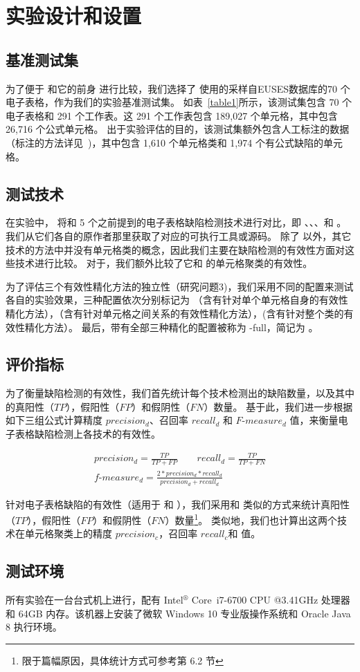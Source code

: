 \section{实验设计和设置}


\subsection{基准测试集} 
为了便于 \wa 和它的前身 \cu 进行比较，我们选择了 \cu 使用的采样自EUSES数据库的70 个电子表格，作为我们的实验基准测试集。
如表~\ref{table1}所示，该测试集包含 70 个电子表格和 291 个工作表。这 291 个工作表包含 189,027 个单元格，其中包含 26,716 个公式单元格。
出于实验评估的目的，该测试集额外包含人工标注的数据（标注的方法详见~\cite{cheung2016custodes})，其中包含 1,610 个单元格类和 1,974 个有公式缺陷的单元格。

\subsection{测试技术} 
在实验中， \wa 将和 5 个之前提到的电子表格缺陷检测技术进行对比，即 \uc、\di、\am、\ca 和 \cu 。
我们从它们各自的原作者那里获取了对应的可执行工具或源码。
除了 \ca 以外，其它技术的方法中并没有单元格类的概念，因此我们主要在缺陷检测的有效性方面对这些技术进行比较。
对于\ca，我们额外比较了它和 \wa 的单元格聚类的有效性。

为了评估三个有效性精化方法的独立性（研究问题3)，我们采用不同的配置来测试各自的实验效果，三种配置依次分别标记为 \wasc （含有针对单个单元格自身的有效性精化方法），\wamc （含有针对单元格之间关系的有效性精化方法），\wawc (含有针对整个类的有效性精化方法）。
最后，带有全部三种精化的配置被称为 \wa-full，简记为 \wa 。

\subsection{评价指标} 
为了衡量缺陷检测的有效性，我们首先统计每个技术检测出的缺陷数量，以及其中的真阳性（$TP$），假阳性（$FP$）和假阴性（$FN$）数量。
基于此，我们进一步根据如下三组公式计算精度 $precision_d$、召回率 $recall_d$ 和 $F\text{-}measure_d$ 值\cite{yoshida2010person}，来衡量电子表格缺陷检测上各技术的有效性。

\begin{gather*}
    precision_d=\frac{TP}{TP + FP}\qquad recall_d = \frac{TP}{TP + FN}\\
    f\text{-}measure_d = \frac{2 * precision_d * recall_d}{precision_d + recall_d}
\end{gather*}

针对电子表格缺陷的有效性（适用于 \wa 和 \cu），我们采用和 \cu 类似的方式来统计真阳性（$TP$），假阳性（$FP$）和假阴性（$FN$）数量\footnote{限于篇幅原因，具体统计方式可参考\cite{cheung2016custodes}第 6.2 节}。
类似地，我们也计算出这两个技术在单元格聚类上的精度 $precision_c$，召回率 $recall_c$和 \fmc 值。

\subsection{测试环境} 
所有实验在一台台式机上进行，配有 Intel$^\circledR$ Core\texttrademark\ i7-6700 CPU @3.41GHz 处理器和 64GB 内存。该机器上安装了微软 Windows 10 专业版操作系统和 Oracle Java 8 执行环境。

